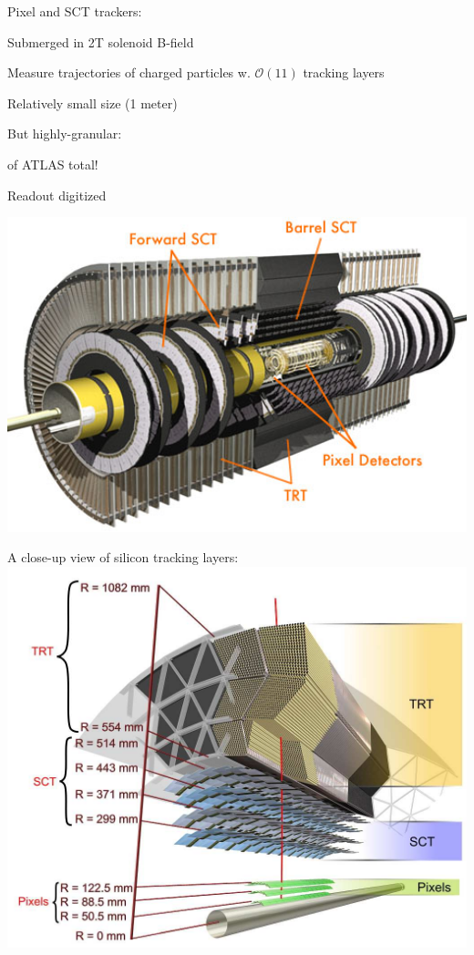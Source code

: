 {
\colb[T]
\centering
Pixel and SCT trackers:
\iteb
\item Submerged in 2T solenoid B-field
\item Measure trajectories of charged particles w. $\mathcal{O}(11)$ tracking layers
\item Relatively small size (1 meter)
\item But highly-granular: 
\iteb
\item {} of ATLAS total!
\itee
\item Readout digitized 
\itee

\includegraphics[width=1.0\textwidth]{dates/mtg/figures/atlas/ID2}


\centering
\tiny{A close-up view of silicon tracking layers:} \\
\includegraphics[width=1.0\textwidth]{dates/mtg/figures/atlas/ID}

\cole
}

